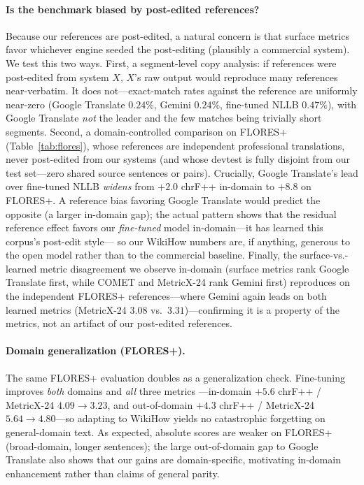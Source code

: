\documentclass[11pt]{article}
\begin{document}
\paragraph{Is the benchmark biased by post-edited references?} Because our references are
post-edited, a natural concern is that surface metrics favor whichever engine seeded the
post-editing (plausibly a commercial system). We test this two ways. First, a segment-level
copy analysis: if references were post-edited from system $X$, $X$'s raw output would
reproduce many references near-verbatim. It does not---exact-match rates against the reference
are uniformly near-zero (Google Translate $0.24\%$, Gemini $0.24\%$, fine-tuned NLLB
$0.47\%$), with Google Translate \emph{not} the leader and the few matches being trivially
short segments. Second, a domain-controlled comparison on FLORES+ (Table~\ref{tab:flores}),
whose references are independent professional translations, never post-edited from our systems
(and whose devtest is fully disjoint from our test set---zero shared source sentences or pairs).
Crucially, Google Translate's lead over fine-tuned NLLB \emph{widens} from $+2.0$ chrF++
in-domain to $+8.8$ on FLORES+. A reference bias favoring Google Translate would predict the
opposite (a larger in-domain gap); the actual pattern shows that the residual reference effect
favors our \emph{fine-tuned} model in-domain---it has learned this corpus's post-edit style---
so our WikiHow numbers are, if anything, generous to the open model rather than to the
commercial baseline. Finally, the surface-vs.-learned metric disagreement we observe
in-domain (surface metrics rank Google Translate first, while COMET and MetricX-24 rank
Gemini first) reproduces on the independent FLORES+ references---where Gemini again leads on
both learned metrics (MetricX-24 $3.08$ vs.\ $3.31$)---confirming it is a property of the
metrics, not an artifact of our post-edited references.

\paragraph{Domain generalization (FLORES+).} The same FLORES+ evaluation doubles as a
generalization check. Fine-tuning improves \emph{both} domains and \emph{all} three metrics
---in-domain $+5.6$ chrF++ / MetricX-24 $4.09\rightarrow3.23$, and out-of-domain $+4.3$ chrF++
/ MetricX-24 $5.64\rightarrow4.80$---so adapting to WikiHow yields no catastrophic forgetting
on general-domain text. As expected, absolute scores are weaker on FLORES+ (broad-domain,
longer sentences); the large out-of-domain gap to Google Translate also shows that our gains
are domain-specific, motivating in-domain enhancement rather than claims of general parity.
\end{document}
